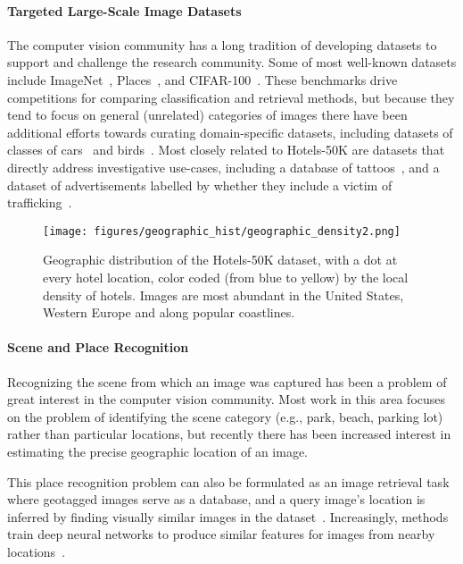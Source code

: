 \paragraph{Targeted Large-Scale Image Datasets} The computer vision community has a long tradition of developing datasets to support and challenge the research community. Some of most well-known datasets include ImageNet~\cite{deng2009imagenet}, Places~\cite{zhou2017places}, and CIFAR-100~\cite{krizhevsky2009learning}.
These benchmarks drive competitions for comparing classification and retrieval methods, but because they tend to focus on general (unrelated) categories of images there have been additional efforts towards curating domain-specific datasets, including datasets of classes of cars~\cite{CAR196} and birds~\cite{wah2011caltech}.  Most closely related to Hotels-50K are datasets that directly address investigative use-cases, including a database of tattoos~\cite{ngan2015tattoo}, and a dataset of advertisements labelled by whether they include a victim of trafficking~\cite{tong2017combating}. 

\begin{figure}
    \centering
    \texttt{[image: figures/geographic\_hist/geographic\_density2.png]}
    \caption{Geographic distribution of the Hotels-50K dataset, with a dot at every hotel location, color coded (from blue to yellow) by the local density of hotels. Images are most abundant in the United States, Western Europe and along popular coastlines. }
    \label{fig:geographicDensity}
\end{figure}

\paragraph{Scene and Place Recognition}
Recognizing the scene from which an image was captured has been a problem of great interest in the computer vision community. Most work in this area focuses on the problem of identifying the scene category (e.g., park, beach, parking lot) rather than particular locations, but recently there has been increased interest in estimating the precise geographic location of an image.

This place recognition problem can also be formulated as an image retrieval task where geotagged images serve as a database, and a query image's location is inferred by finding visually similar images in the dataset~\cite{baatz2012large,chen2011city,crandall2009mapping,hays2008im2gps,jacobs07geolocate,schindler2007city,torii2013visual,zamir2010accurate,googleLandmarks}. Increasingly, methods train deep neural networks to produce similar features for images from nearby locations~\cite{zhou2014recognizing,netvlad,visualPlaceRecognition,vo2017revisit,zhai2018geotemporal}.  

